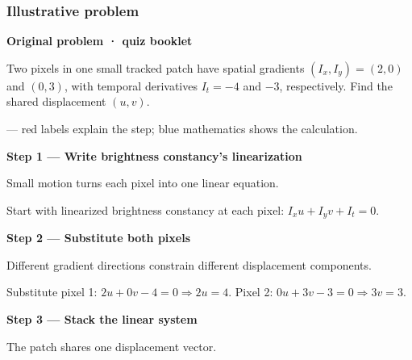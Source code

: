\documentclass[letterpaper,11pt,english,openany,oneside]{jupyterBook}
\begin{document}
\subsubsection{Illustrative problem}
\label{\detokenize{lectures/lecture05/quiz-workbook:quiz-a3-q1}}\label{\detokenize{lectures/lecture05/quiz-workbook:id1}}
\par\medskip\textbf{Original problem · quiz booklet}\par\smallskip

\sphinxAtStartPar
Two pixels in one small tracked patch have spatial gradients \((I_x,I_y)=(2,0)\) and \((0,3)\), with temporal derivatives \(I_t=-4\) and \(-3\), respectively. Find the shared displacement \((u,v)\).

\par\medskip

\sphinxAtStartPar
{} — red labels explain the step; blue mathematics shows the calculation.

\par\medskip{}
{\color{QuizStepRed}\bfseries Step 1 — Write brightness constancy's linearization}\par\smallskip

\sphinxAtStartPar
{} Small motion turns each pixel into one linear equation.

\sphinxAtStartPar
Start with linearized brightness constancy at each pixel: {\color{QuizMathBlue} \(I_xu+I_yv+I_t=0\)}.

\par

\par\medskip{}
{\color{QuizStepRed}\bfseries Step 2 — Substitute both pixels}\par\smallskip

\sphinxAtStartPar
{} Different gradient directions constrain different displacement components.

\sphinxAtStartPar
Substitute pixel 1: {\color{QuizMathBlue} \(2u+0v-4=0\Rightarrow 2u=4\)}. Pixel 2: {\color{QuizMathBlue} \(0u+3v-3=0\Rightarrow3v=3\)}.

\par

\par\medskip{}
{\color{QuizStepRed}\bfseries Step 3 — Stack the linear system}\par\smallskip

\sphinxAtStartPar
{} The patch shares one displacement vector.
\end{document}

